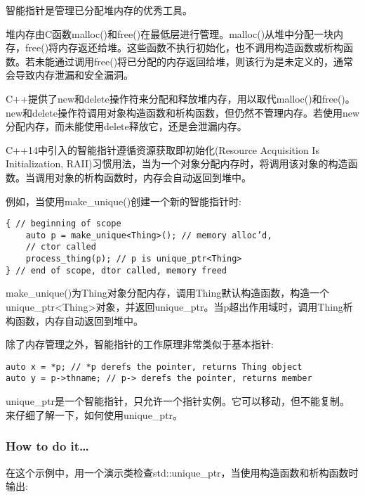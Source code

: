 
智能指针是管理已分配堆内存的优秀工具。

堆内存由C函数malloc()和free()在最低层进行管理。malloc()从堆中分配一块内存，free()将内存返还给堆。这些函数不执行初始化，也不调用构造函数或析构函数。若未能通过调用free()将已分配的内存返回给堆，则该行为是未定义的，通常会导致内存泄漏和安全漏洞。

C++提供了new和delete操作符来分配和释放堆内存，用以取代malloc()和free()。new和delete操作符调用对象构造函数和析构函数，但仍然不管理内存。若使用new分配内存，而未能使用delete释放它，还是会泄漏内存。

C++14中引入的智能指针遵循资源获取即初始化(Resource Acquisition Is Initialization, RAII)习惯用法，当为一个对象分配内存时，将调用该对象的构造函数。当调用对象的析构函数时，内存会自动返回到堆中。

例如，当使用make\_unique()创建一个新的智能指针时:

\begin{lstlisting}[style=styleCXX]
{ // beginning of scope
	auto p = make_unique<Thing>(); // memory alloc’d,
	// ctor called
	process_thing(p); // p is unique_ptr<Thing>
} // end of scope, dtor called, memory freed
\end{lstlisting}

make\_unique()为Thing对象分配内存，调用Thing默认构造函数，构造一个unique\_ptr<Thing>对象，并返回unique\_ptr。当p超出作用域时，调用Thing析构函数，内存自动返回到堆中。

除了内存管理之外，智能指针的工作原理非常类似于基本指针:

\begin{lstlisting}[style=styleCXX]
auto x = *p; // *p derefs the pointer, returns Thing object
auto y = p->thname; // p-> derefs the pointer, returns member
\end{lstlisting}

unique\_ptr是一个智能指针，只允许一个指针实例。它可以移动，但不能复制。来仔细了解一下，如何使用unique\_ptr。

\subsubsection{How to do it…}

在这个示例中，用一个演示类检查std::unique\_ptr，当使用构造函数和析构函数时输出:

